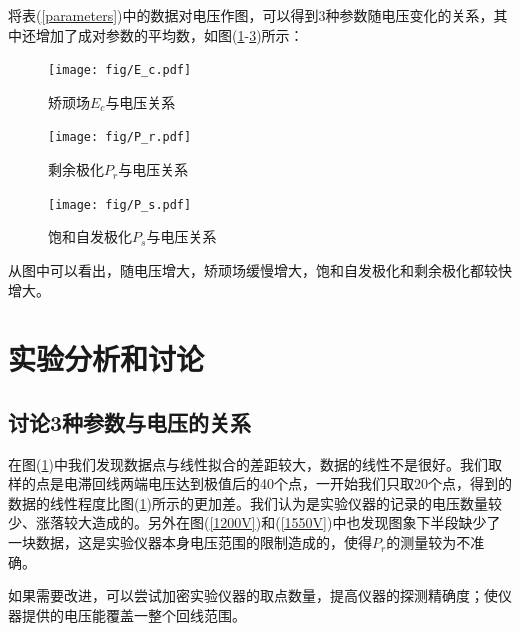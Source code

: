 \documentclass[a4paper]{article}
\begin{document}
将表(\ref{parameters})中的数据对电压作图，可以得到3种参数随电压变化的关系，其中还增加了成对参数的平均数，如图(\ref{E_c}-\ref{P_s})所示：
\begin{figure}[!h]
    \centering
    \texttt{[image: fig/E\_c.pdf]}
    \caption{矫顽场$E_c$与电压关系}\label{E_c}
\end{figure}

\begin{figure}[!h]
    \centering
    \texttt{[image: fig/P\_r.pdf]}
    \caption{剩余极化$P_r$与电压关系}\label{P_r}
\end{figure}

\begin{figure}[!h]
    \centering
    \texttt{[image: fig/P\_s.pdf]}
    \caption{饱和自发极化$P_s$与电压关系}\label{P_s}
\end{figure}

从图中可以看出，随电压增大，矫顽场缓慢增大，饱和自发极化和剩余极化都较快增大。

\newpage
\phantom{something}
\newpage

\section{实验分析和讨论}
\iffalse
\subsection{讨论3种参数与电压的关系}
在图(\ref{E_c})中我们发现数据点与线性拟合的差距较大，数据的线性不是很好。我们取样的点是电滞回线两端电压达到极值后的40个点，一开始我们只取20个点，得到的数据的线性程度比图(\ref{E_c})所示的更加差。我们认为是实验仪器的记录的电压数量较少、涨落较大造成的。另外在图(\ref{1200V})和(\ref{1550V})中也发现图象下半段缺少了一块数据，这是实验仪器本身电压范围的限制造成的，使得$P_r$的测量较为不准确。

如果需要改进，可以尝试加密实验仪器的取点数量，提高仪器的探测精确度；使仪器提供的电压能覆盖一整个回线范围。
\end{document}
